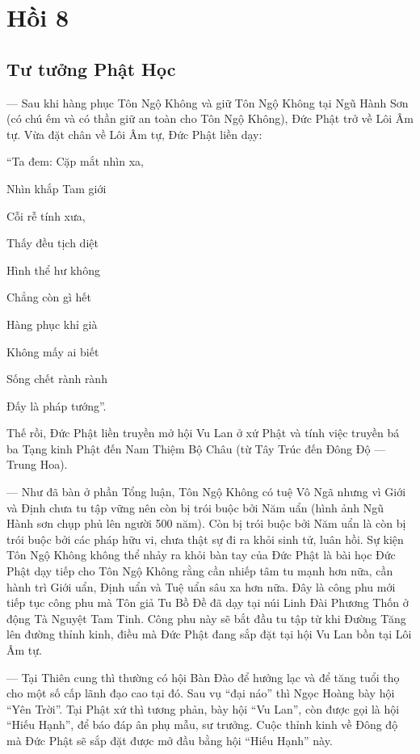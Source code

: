 \chapter{Hồi 8} %
\label{cha:hoi_8}

\section{Tư tưởng Phật Học} %
\label{sec:8_phat_hoc}

— Sau khi hàng phục Tôn Ngộ Không và giữ Tôn Ngộ Không tại Ngũ Hành Sơn (có chú ếm và có thần giữ an toàn cho Tôn Ngộ Không), Đức Phật trở về Lôi Âm tự. Vừa đặt chân về Lôi Âm tự, Đức Phật liền dạy:

\begin{itshape}
``Ta đem: Cặp mắt nhìn xa,

Nhìn khắp Tam giới

Cỗi rễ tính xưa,

Thấy đều tịch diệt

Hình thể hư không

Chẳng còn gì hết

Hàng phục khỉ già

Không mấy ai biết

Sống chết rành rành

Đấy là pháp tướng''.
\end{itshape}

Thế rồi, Đức Phật liền truyền mở hội Vu Lan ở xứ Phật và tính việc truyền bá ba Tạng kinh Phật đến Nam Thiệm Bộ Châu (từ Tây Trúc đến Đông Độ — Trung Hoa).

— Như đã bàn ở phần Tổng luận, Tôn Ngộ Không có tuệ Vô Ngã nhưng vì Giới và Định chưa tu tập vững nên còn bị trói buộc bởi Năm uẩn (hình ảnh Ngũ Hành sơn chụp phủ lên người 500 năm). Còn bị trói buộc bởi Năm uẩn là còn bị trói buộc bởi các pháp hữu vi, chưa thật sự đi ra khỏi sinh tử, luân hồi. Sự kiện Tôn Ngộ Không không thể nhảy ra khỏi bàn tay của Đức Phật là bài học Đức Phật dạy tiếp cho Tôn Ngộ Không rằng cần nhiếp tâm tu mạnh hơn nữa, cần hành trì Giới uẩn, Định uẩn và Tuệ uẩn sâu xa hơn nữa. Đây là công phu mới tiếp tục công phu mà Tôn giả Tu Bồ Đề đã dạy tại núi Linh Đài Phương Thốn ở động Tà Nguyệt Tam Tinh. Công phu này sẽ bắt đầu tu tập từ khi Đường Tăng lên đường thỉnh kinh, điều mà Đức Phật đang sắp đặt tại hội Vu Lan bồn tại Lôi Âm tự.

— Tại Thiên cung thì thường có hội Bàn Đào để hưởng lạc và để tăng tuổi thọ cho một số cấp lãnh đạo cao tại đó. Sau vụ ``đại náo'' thì Ngọc Hoàng bày hội ``Yên Trời''. Tại Phật xứ thì tương phản, bày hội ``Vu Lan'', còn được gọi là hội ``Hiếu Hạnh'', để báo đáp ân phụ mẫu, sư trưởng. Cuộc thỉnh kinh về Đông độ mà Đức Phật sẽ sắp đặt được mở đầu bằng hội ``Hiếu Hạnh'' này.

